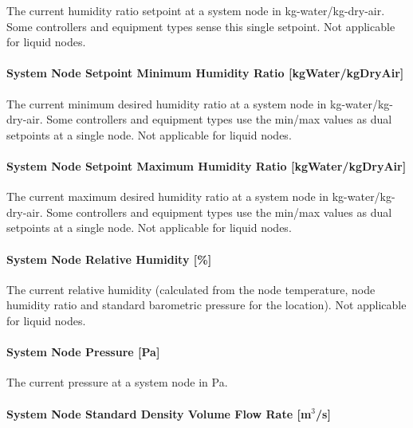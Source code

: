 The current humidity ratio setpoint at a system node in kg-water/kg-dry-air. Some controllers and equipment types sense this single setpoint. Not applicable for liquid nodes.

\paragraph{System Node Setpoint Minimum Humidity Ratio {[}kgWater/kgDryAir{]}}\label{system-node-setpoint-minimum-humidity-ratio-kgwaterkgdryair}

The current minimum desired humidity ratio at a system node in kg-water/kg-dry-air. Some controllers and equipment types use the min/max values as dual setpoints at a single node. Not applicable for liquid nodes.

\paragraph{System Node Setpoint Maximum Humidity Ratio {[}kgWater/kgDryAir{]}}\label{system-node-setpoint-maximum-humidity-ratio-kgwaterkgdryair}

The current maximum desired humidity ratio at a system node in kg-water/kg-dry-air. Some controllers and equipment types use the min/max values as dual setpoints at a single node. Not applicable for liquid nodes.

\paragraph{System Node Relative Humidity {[}\%{]}}\label{system-node-relative-humidity}

The current relative humidity (calculated from the node temperature, node humidity ratio and standard barometric pressure for the location). Not applicable for liquid nodes.

\paragraph{System Node Pressure {[}Pa{]}}\label{system-node-pressure-pa}

The current pressure at a system node in Pa.

\paragraph{\texorpdfstring{System Node Standard Density Volume Flow Rate {[}m\(^{3}\)/s{]}}{System Node Standard Density Volume Flow Rate {[}m\^{}\{3\}/s{]}}}\label{system-node-standard-density-volume-flow-rate-m3s}

